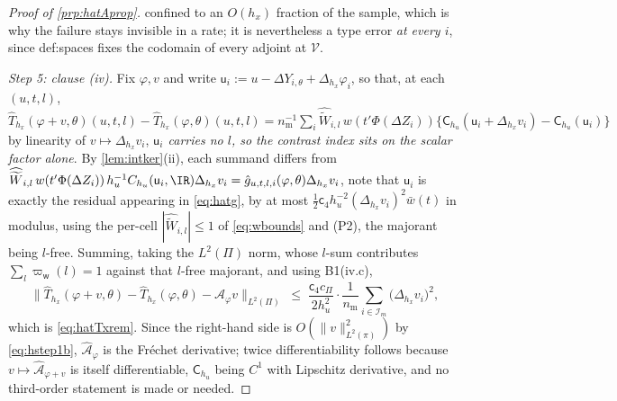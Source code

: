 \begin{proof}[Proof of \cref{prp:hatAprop}]
confined to an $O(h_x)$ fraction of the sample, which is why the failure stays invisible in a rate; it is
nevertheless a type error \emph{at every $i$}, since
def:spaces fixes the codomain of every adjoint at $\mathcal V$.

\emph{Step 5: clause (iv).} Fix $\varphi,v$ and write $\mathsf u_i:=u-\Delta Y_{i,\theta}+\Delta_{h_x}\varphi_i$,
so that, at each $(u,t,l)$,
$\hat T_{h_x}(\varphi+v,\theta)(u,t,l)-\hat T_{h_x}(\varphi,\theta)(u,t,l)
=n_{\mathrm m}^{-1}\sum_i\widehat{\widetilde W}_{i,l}\,w(t'\Phi(\Delta Z_i))\{\mathsf C_{h_u}(\mathsf u_i+\Delta_{h_x}v_i)-\mathsf C_{h_u}(\mathsf u_i)\}$
by linearity of $v\mapsto\Delta_{h_x}v_i$, \emph{$\mathsf u_i$ carries no $l$, so the contrast index
sits on the scalar factor alone}. By \cref{lem:intker}(ii), each summand differs from
$\widehat{\widetilde W}_{i,l}\,w(t'\Phi(\Delta Z_i))\,h_u^{-1}C_{h_u}(\mathsf u_i,\IR)\Delta_{h_x}v_i
=\hat g_{u,t,l,i}(\varphi,\theta)\Delta_{h_x}v_i$, note that $\mathsf u_i$ is exactly the residual appearing in
\eqref{eq:hatg}, by at most $\tfrac12\mathsf c_4h_u^{-2}(\Delta_{h_x}v_i)^{2}\bar w(t)$ in modulus,
using the per-cell $|\widehat{\widetilde W}_{i,l}|\le1$ of \eqref{eq:wbounds} and (P2), the majorant
being $l$-free. Summing, taking the $L^{2}(\Pi)$ norm, whose $l$-sum contributes
$\sum_l\varpi_{\mathsf w}(l)=1$ against that $l$-free majorant, and using B1(iv.c),
\[
\big\|\hat T_{h_x}(\varphi+v,\theta)-\hat T_{h_x}(\varphi,\theta)-\hat{\mathcal A}_\varphi v\big\|_{L^{2}(\Pi)}
\;\le\;\frac{\mathsf c_4c_\Pi}{2h_u^{2}}\cdot\frac1{n_{\mathrm m}}\sum_{i\in\mathcal I_m}\big(\Delta_{h_x}v_i\big)^{2},
\]
which is \eqref{eq:hatTxrem}. Since the right-hand side is $O(\|v\|^{2}_{L^{2}(\pi)})$ by
\eqref{eq:hstep1b}, $\hat{\mathcal A}_\varphi$ is the Fr\'echet derivative; twice differentiability
follows because $v\mapsto\hat{\mathcal A}_{\varphi+v}$ is itself differentiable, $\mathsf C_{h_u}$
being $C^1$ with Lipschitz derivative, and no third-order statement is made or needed.


\end{proof}
